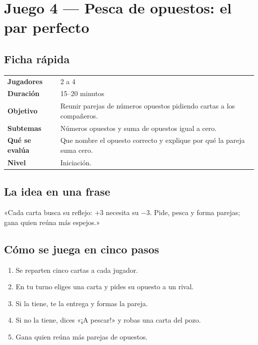 \documentclass[12pt, letterpaper]{article}
\begin{document}
\clearpage
\section{Juego 4 — Pesca de opuestos: el par perfecto}

\subsection{Ficha rápida}

\begin{center}
\small
\begin{tabular}{@{}p{3cm} p{12.2cm}@{}}
\toprule
\textbf{Jugadores} & 2 a 4\\
\textbf{Duración} & 15--20 minutos\\
\textbf{Objetivo} & Reunir parejas de números opuestos pidiendo cartas a los compañeros.\\
\textbf{Subtemas} & Números opuestos y suma de opuestos igual a cero.\\
\textbf{Qué se evalúa} & Que nombre el opuesto correcto y explique por qué la pareja suma cero.\\
\textbf{Nivel} & Iniciación.\\
\bottomrule
\end{tabular}
\end{center}

\subsection{La idea en una frase}

\begin{cuadroextra}
  «Cada carta busca su reflejo: $+3$ necesita su $-3$. Pide, pesca y forma parejas; gana quien reúna más espejos.»
\end{cuadroextra}

\subsection{Cómo se juega en cinco pasos}

\begin{enumerate}[leftmargin=*]
  \item Se reparten cinco cartas a cada jugador.
  \item En tu turno eliges una carta y pides su opuesto a un rival.
  \item Si la tiene, te la entrega y formas la pareja.
  \item Si no la tiene, dices «¡A pescar!» y robas una carta del pozo.
  \item Gana quien reúna más parejas de opuestos.
\end{enumerate}
\end{document}
